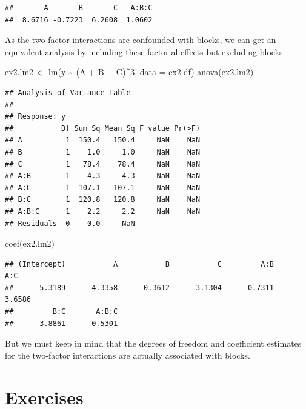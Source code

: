 \documentclass[
]{book}
\newenvironment{Shaded}{\begin{snugshade}}{\end{snugshade}}
\newcommand{\AttributeTok}[1]{\textcolor[rgb]{0.77,0.63,0.00}{#1}}
\newcommand{\DecValTok}[1]{\textcolor[rgb]{0.00,0.00,0.81}{#1}}
\newcommand{\FunctionTok}[1]{\textcolor[rgb]{0.00,0.00,0.00}{#1}}
\newcommand{\NormalTok}[1]{#1}
\newcommand{\OtherTok}[1]{\textcolor[rgb]{0.56,0.35,0.01}{#1}}
\newcommand{\SpecialCharTok}[1]{\textcolor[rgb]{0.00,0.00,0.00}{#1}}
\theoremstyle{definition}
\theoremstyle{definition}
\theoremstyle{definition}
\theoremstyle{definition}
\theoremstyle{remark}
\begin{document}
\begin{verbatim}
##       A       B       C   A:B:C 
##  8.6716 -0.7223  6.2608  1.0602
\end{verbatim}

As the two-factor interactions are confounded with blocks, we can get an equivalent analysis by including these factorial effects but excluding blocks.

\begin{Shaded}
\begin{Highlighting}[]
\NormalTok{ex2.lm2 }\OtherTok{\textless{}{-}} \FunctionTok{lm}\NormalTok{(y }\SpecialCharTok{\textasciitilde{}}\NormalTok{  (A }\SpecialCharTok{+}\NormalTok{ B }\SpecialCharTok{+}\NormalTok{ C)}\SpecialCharTok{\^{}}\DecValTok{3}\NormalTok{, }\AttributeTok{data =}\NormalTok{ ex2.df)}
\FunctionTok{anova}\NormalTok{(ex2.lm2)}
\end{Highlighting}
\end{Shaded}

\begin{verbatim}
## Analysis of Variance Table
## 
## Response: y
##           Df Sum Sq Mean Sq F value Pr(>F)
## A          1  150.4   150.4     NaN    NaN
## B          1    1.0     1.0     NaN    NaN
## C          1   78.4    78.4     NaN    NaN
## A:B        1    4.3     4.3     NaN    NaN
## A:C        1  107.1   107.1     NaN    NaN
## B:C        1  120.8   120.8     NaN    NaN
## A:B:C      1    2.2     2.2     NaN    NaN
## Residuals  0    0.0     NaN
\end{verbatim}

\begin{Shaded}
\begin{Highlighting}[]
\FunctionTok{coef}\NormalTok{(ex2.lm2)}
\end{Highlighting}
\end{Shaded}

\begin{verbatim}
## (Intercept)           A           B           C         A:B         A:C 
##      5.3189      4.3358     -0.3612      3.1304      0.7311      3.6586 
##         B:C       A:B:C 
##      3.8861      0.5301
\end{verbatim}

But we must keep in mind that the degrees of freedom and coefficient estimates for the two-factor interactions are actually associated with blocks.

\hypertarget{exercises-4}{%
\section{Exercises}\label{exercises-4}}
\end{document}
